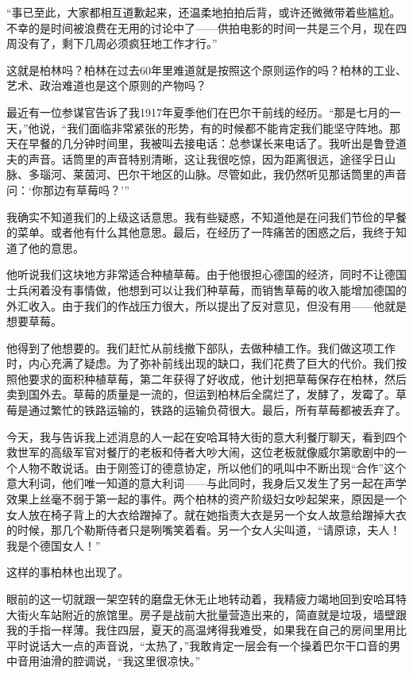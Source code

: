 \documentclass[UTF8]{ctexart}
\begin{document}
“事已至此，大家都相互道歉起来，还温柔地拍拍后背，或许还微微带着些尴尬。不幸的是时间被浪费在无用的讨论中了——供拍电影的时间一共是三个月，现在四周没有了，剩下几周必须疯狂地工作才行。”

这就是柏林吗？柏林在过去60年里难道就是按照这个原则运作的吗？柏林的工业、艺术、政治难道也是这个原则的产物吗？

最近有一位参谋官告诉了我1917年夏季他们在巴尔干前线的经历。“那是七月的一天，”他说，“我们面临非常紧张的形势，有的时候都不能肯定我们能坚守阵地。那天在早餐的几分钟时间里，我被叫去接电话：总参谋长来电话了。我听出是鲁登道夫的声音。话筒里的声音特别清晰，这让我很吃惊，因为距离很远，途径孚日山脉、多瑙河、莱茵河、巴尔干地区的山脉。尽管如此，我仍然听见那话筒里的声音问：‘你那边有草莓吗？’”

我确实不知道我们的上级这话意思。我有些疑惑，不知道他是在问我们节俭的早餐的菜单。或者他有什么其他意思。最后，在经历了一阵痛苦的困惑之后，我终于知道了他的意思。

他听说我们这块地方非常适合种植草莓。由于他很担心德国的经济，同时不让德国士兵闲着没有事情做，他想到可以让我们种草莓，而销售草莓的收入能增加德国的外汇收入。由于我们的作战压力很大，所以提出了反对意见，但没有用——他就是想要草莓。

他得到了他想要的。我们赶忙从前线撤下部队，去做种植工作。我们做这项工作时，内心充满了疑虑。为了弥补前线出现的缺口，我们花费了巨大的代价。我们按照他要求的面积种植草莓，第二年获得了好收成，他计划把草莓保存在柏林，然后卖到国外去。草莓的质量是一流的，但运到柏林后全腐烂了，发酵了，发霉了。草莓是通过繁忙的铁路运输的，铁路的运输负荷很大。最后，所有草莓都被丢弃了。

今天，我与告诉我上述消息的人一起在安哈耳特大街的意大利餐厅聊天，看到四个救世军的高级军官对餐厅的老板和侍者大吵大闹，这位老板就像威尔第歌剧中的一个人物不敢说话。由于刚签订的德意协定，所以他们的吼叫中不断出现“合作”这个意大利词，他们唯一知道的意大利词——与此同时，我身后又发生了另一起在声学效果上丝毫不弱于第一起的事件。两个柏林的资产阶级妇女吵起架来，原因是一个女人放在椅子背上的大衣给蹭掉了。就在她指责大衣是另一个女人故意给蹭掉大衣的时候，那几个勒斯侍者只是咧嘴笑着看。另一个女人尖叫道，“请原谅，夫人！我是个德国女人！”

这样的事柏林也出现了。

眼前的这一切就跟一架空转的磨盘无休无止地转动着，我精疲力竭地回到安哈耳特大街火车站附近的旅馆里。房子是战前大批量营造出来的，简直就是垃圾，墙壁跟我的手指一样薄。我住四层，夏天的高温烤得我难受，如果我在自己的房间里用比平时说话大一点的声音说，“太热了，”我敢肯定一层会有一个操着巴尔干口音的男中音用油滑的腔调说，“我这里很凉快。”
\end{document}
